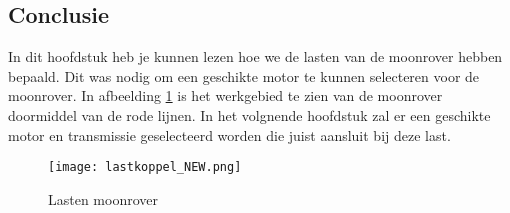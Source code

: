 \newpage

\subsection{Conclusie}
In dit hoofdstuk heb je kunnen lezen hoe we de lasten van de moonrover hebben bepaald. Dit was nodig om een geschikte motor te kunnen selecteren voor de moonrover.  In afbeelding \ref{fig:lasten moonrover} is het werkgebied te zien van de moonrover doormiddel van de rode lijnen. In het volgnende hoofdstuk zal er een geschikte motor en transmissie geselecteerd worden die juist aansluit bij deze last. 

\begin{figure}[H]
    \centering
    \texttt{[image: lastkoppel\_NEW.png]}
    \caption{Lasten moonrover}
    \label{fig:lasten moonrover}
\end{figure}
    
